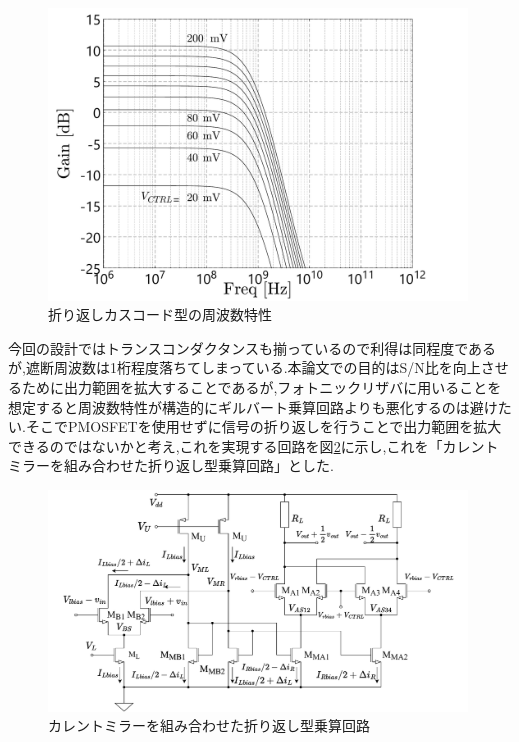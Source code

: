         \begin{figure}[!b]
            \centering
            \includegraphics[width=0.99\textwidth]{figures/chapter3/folded_ac.pdf}
            \caption{折り返しカスコード型の周波数特性}
            \label{fig:3_folded_gilbert_ac}
        \end{figure}
        \clearpage
        今回の設計ではトランスコンダクタンスも揃っているので利得は同程度であるが,遮断周波数は1桁程度落ちてしまっている.本論文での目的はS/N比を向上させるために出力範囲を拡大することであるが,フォトニックリザバに用いることを想定すると周波数特性が構造的にギルバート乗算回路よりも悪化するのは避けたい.そこでPMOSFETを使用せずに信号の折り返しを行うことで出力範囲を拡大できるのではないかと考え,これを実現する回路を図\ref{fig:3_folded_mirror_gilbert}に示し,これを「カレントミラーを組み合わせた折り返し型乗算回路」とした.\par
        \begin{figure}[!b]
            \begin{center}
                \includegraphics[width=0.99\textwidth]{figures/chapter3/NtoNFolded.pdf}
                \caption{カレントミラーを組み合わせた折り返し型乗算回路}
                \label{fig:3_folded_mirror_gilbert}
            \end{center}
        \end{figure}
